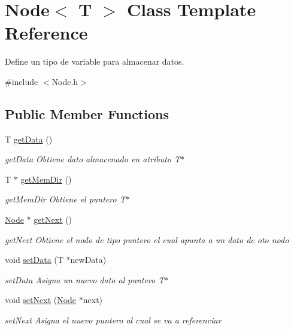 \hypertarget{class_node}{}\section{Node$<$ T $>$ Class Template Reference}
\label{class_node}


Define un tipo de variable para almacenar datos.  




{\ttfamily \#include $<$Node.\+h$>$}

\subsection*{Public Member Functions}
\begin{DoxyCompactItemize}
\item 
T \hyperlink{class_node_a0c3315ee2e897e2a6e1c24aeca20aeb9}{get\+Data} ()
\begin{DoxyCompactList}\small\item\em get\+Data Obtiene dato almacenado en atributo T$\ast$ \end{DoxyCompactList}\item 
T $\ast$ \hyperlink{class_node_a97539dd60d75f178a43114db930b3a88}{get\+Mem\+Dir} ()
\begin{DoxyCompactList}\small\item\em get\+Mem\+Dir Obtiene el puntero T$\ast$ \end{DoxyCompactList}\item 
\hyperlink{class_node}{Node} $\ast$ \hyperlink{class_node_a688501032615bbd05c9f42ef89d63db5}{get\+Next} ()
\begin{DoxyCompactList}\small\item\em get\+Next Obtiene el nodo de tipo puntero el cual apunta a un dato de oto nodo \end{DoxyCompactList}\item 
void \hyperlink{class_node_aa2e4b0f1ecd50a82f1271b40ffce9ffa}{set\+Data} (T $\ast$new\+Data)
\begin{DoxyCompactList}\small\item\em set\+Data Asigna un nuevo dato al puntero T$\ast$ \end{DoxyCompactList}\item 
void \hyperlink{class_node_ac53cb74d17df1997e438e7f34e7b43f0}{set\+Next} (\hyperlink{class_node}{Node} $\ast$next)
\begin{DoxyCompactList}\small\item\em set\+Next Asigna el nuevo puntero al cual se va a referenciar \end{DoxyCompactList}\item 

\end{DoxyCompactItemize}
